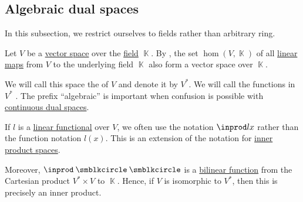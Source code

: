 \subsection{Algebraic dual spaces}\label{subsec:algebraic_dual_spaces}

In this subsection, we restrict ourselves to fields rather than arbitrary ring.

\begin{definition}\label{def:dual_vector_space}
  Let \( V \) be a \hyperref[def:vector_space]{vector space} over the \hyperref[def:field]{field} \( \BbbK \). By , the set \( \hom(V, \BbbK) \) of all \hyperref[def:semimodule/homomorphism]{linear maps} from \( V \) to the underlying field \( \BbbK \) also form a vector space over \( \BbbK \).

  We will call this space the  of \( V \) and denote it by \( V^* \). We will call the functions in \( V^* \) . The prefix \enquote{algebraic} is important when confusion is possible with \hyperref[def:continuous_dual_space]{continuous dual spaces}.
\end{definition}

\begin{remark}\label{rem:dual_space_bilinear_form}
  If \( l \) is a \hyperref[def:dual_vector_space]{linear functional} over \( V \), we often use the notation \( \inprod l x \) rather than the function notation \( l(x) \). This is an extension of the notation for \hyperref[def:inner_product_space]{inner product spaces}.

  Moreover, \( \inprod \anon \anon \) is a \hyperref[def:multilinear_function]{bilinear function} from the Cartesian product \( V^* \times V \) to \( \BbbK \). Hence, if \( V \) is isomorphic to \( V^* \), then this is precisely an inner product.
\end{remark}


